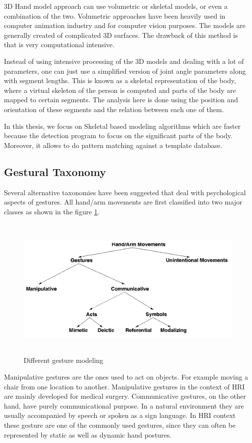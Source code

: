3D Hand model approach can use volumetric or skeletal models, or even a combination of the two. Volumetric approaches have been heavily used in computer animation industry and for computer vision purposes. The models are generally created of complicated 3D surfaces. The drawback of this method is that is very computational intensive. 

Instead of using intensive processing of the 3D models and dealing with a lot of parameters, one can just use a simplified version of joint angle parameters along with segment lengths. This is known as a skeletal representation of the body, where a virtual skeleton of the person is computed and parts of the body are mapped to certain segments. The analysis here is done using the position and orientation of these segments and the relation between each one of them.

In this thesis, we focus on Skeletal based modeling algorithms which are faster because the detection program to focus on the significant parts of the body. Moreover, it allows to do pattern matching against a template database. 


\subsection{Gestural Taxonomy }
Several alternative taxonomies have been suggested that deal with psychological aspects of gestures. All hand/arm movements are first classified into two major classes as shown in the figure \ref{fig:ges:tax}.

\begin{figure}
	[h] \centering 
	\includegraphics[height=7cm]{figures/ges-tax.png} 
	\caption{Different gesture modeling} 
	\label{fig:ges:tax} 
\end{figure}

Manipulative gestures are the ones used to act on objects. For example moving a chair from one location to another. Manipulative gestures in the context of HRI are mainly developed for medical surgery. Communicative gestures, on the other hand, have purely communicational purpose. In a natural environment they are usually accompanied by speech or spoken as a sign language. In HRI context these gesture are one of the commonly used gestures, since they can often be represented by static as well as dynamic hand postures.

